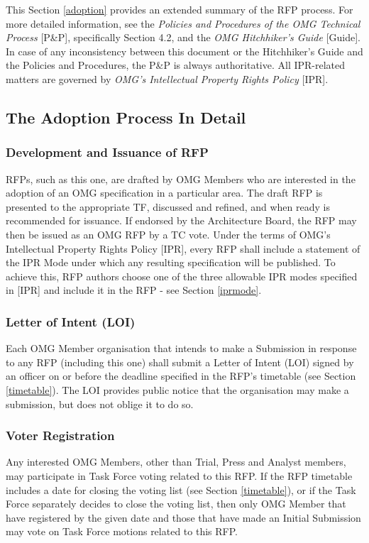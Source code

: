 This Section \ref{adoption} provides an extended summary of the RFP process. For more detailed information, see the \textit{Policies and Procedures of the OMG Technical Process} [P\&P], specifically Section 4.2, and the \textit{OMG Hitchhiker's Guide} [Guide]. In case of any inconsistency between this document or the Hitchhiker's Guide and the Policies and Procedures, the P\&P is always authoritative. All IPR-related matters are governed by \textit{OMG's Intellectual Property Rights Policy} [IPR].

\subsection{The Adoption Process In Detail}
\subsubsection{Development and Issuance of RFP}

RFPs, such as this one, are drafted by OMG Members who are interested in the adoption of an OMG specification in a particular area. The draft RFP is presented to the appropriate TF, discussed and refined, and when ready is recommended for issuance. If endorsed by the Architecture Board, the RFP may then be issued as an OMG RFP by a TC vote.
Under the terms of OMG's Intellectual Property Rights Policy [IPR], every RFP shall include a statement of the IPR Mode under which any resulting specification will be published. To achieve this, RFP authors choose one of the three allowable IPR modes specified in [IPR] and include it in the RFP - see Section \ref{iprmode}.


\subsubsection{Letter of Intent (LOI)}

Each OMG Member organisation that intends to make a Submission in response to any RFP (including this one) shall submit a Letter of Intent (LOI) signed by an officer on or before the deadline specified in the RFP's timetable (see Section \ref{timetable}). The LOI provides public notice that the organisation may make a submission, but does not oblige it to do so.


\subsubsection{Voter Registration}

Any interested OMG Members, other than Trial, Press and Analyst members, may participate in Task Force voting related to this RFP. If the RFP timetable includes a date for closing the voting list (see Section \ref{timetable}), or if the Task Force separately decides to close the voting list, then only OMG Member that have registered by the given date and those that have made an Initial Submission may vote on Task Force motions related to this RFP.

